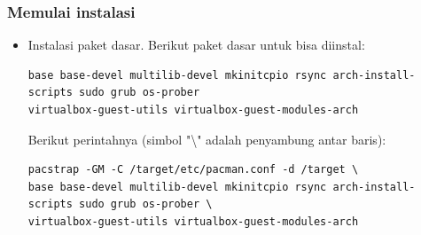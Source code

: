 \documentclass[12pt,]{article}
\begin{document}
	\subsubsection{Memulai instalasi}
	\begin{itemize}
		\item Instalasi paket dasar.
		Berikut paket dasar untuk bisa diinstal:
		\begin{verbatim}
base base-devel multilib-devel mkinitcpio rsync arch-install-scripts sudo grub os-prober
virtualbox-guest-utils virtualbox-guest-modules-arch
		\end{verbatim}
		Berikut perintahnya (simbol "\textbackslash" adalah penyambung antar baris):
		\begin{verbatim}
pacstrap -GM -C /target/etc/pacman.conf -d /target \
base base-devel multilib-devel mkinitcpio rsync arch-install-scripts sudo grub os-prober \
virtualbox-guest-utils virtualbox-guest-modules-arch
		\end{verbatim}
	\end{itemize}
\end{document}
